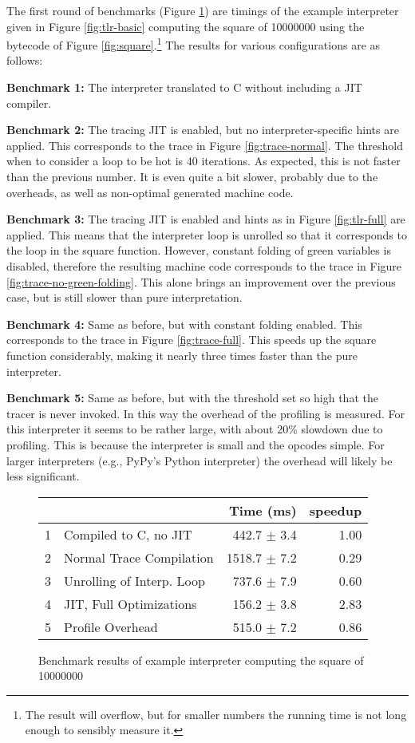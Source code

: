 \documentclass{sig-alternate}
\newcommand\eg{e.g.,\xspace}
\begin{document}
The first round of benchmarks (Figure \ref{fig:bench1}) are timings of the
example interpreter given in Figure \ref{fig:tlr-basic} computing
the square of 10000000 using the bytecode of Figure \ref{fig:square}.\footnote{The result will overflow, but for smaller numbers the
running time is not long enough to sensibly measure it.}
The results for various
configurations are as follows:

\textbf{Benchmark 1:} The interpreter translated to C without including a JIT
compiler.

\textbf{Benchmark 2:} The tracing JIT is enabled, but no inter\-preter-specific
hints are applied. This corresponds to the trace in Figure
\ref{fig:trace-normal}.  The threshold when to consider a loop to be hot is 40
iterations.  As expected, this is not faster than the previous number. It is
even quite a bit slower, probably due to the overheads, as well as
non-optimal generated machine code.

\textbf{Benchmark 3:} The tracing JIT is enabled and hints as in Figure
\ref{fig:tlr-full} are applied. This means that the interpreter loop is unrolled
so that it corresponds to the loop in the square function. However, constant folding of green
variables is disabled, therefore the resulting machine code corresponds to the
trace in Figure \ref{fig:trace-no-green-folding}. This alone brings an
improvement over the previous case, but is still slower than pure
interpretation.

\textbf{Benchmark 4:} Same as before, but with constant folding enabled. This corresponds to the
trace in Figure \ref{fig:trace-full}. This speeds up the square function considerably,
making it nearly three times faster than the pure interpreter.

\textbf{Benchmark 5:} Same as before, but with the threshold set so high that the tracer is
never invoked. In this way the overhead of the profiling is measured. For this interpreter
it seems to be rather large, with about 20\% slowdown due to profiling. This is because the interpreter 
is small and the opcodes simple. For larger interpreters (\eg PyPy's Python
interpreter) the overhead will likely be less significant.

\begin{figure}
\noindent
\begin{tabular}{|l|l|r|r|}
\hline
& &Time (ms) &speedup\\
\hline
1 &Compiled to C, no JIT &442.7 $\pm$ 3.4 &1.00\\
2 &Normal Trace Compilation &1518.7 $\pm$ 7.2 &0.29\\
3 &Unrolling of Interp. Loop &737.6 $\pm$ 7.9 &0.60\\
4 &JIT, Full Optimizations &156.2 $\pm$ 3.8 &2.83\\
5 &Profile Overhead &515.0 $\pm$ 7.2 &0.86\\
\hline
\end{tabular}
\caption{Benchmark results of example interpreter computing the square of
\label{fig:bench1}
10000000}
\end{figure}
\end{document}
